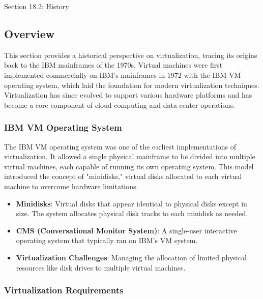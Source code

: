 \begin{notes}{Section 18.2: History}
    \subsection*{Overview}

    This section provides a historical perspective on virtualization, tracing its origins back to the IBM mainframes of the 1970s. Virtual machines were first implemented commercially on IBM's mainframes in 1972 with the IBM VM operating system, which laid the foundation for modern virtualization techniques. Virtualization has since evolved to support various hardware platforms and has become a core component of cloud computing and data-center operations.
    
    \subsubsection*{IBM VM Operating System}
    
    The IBM VM operating system was one of the earliest implementations of virtualization. It allowed a single physical mainframe to be divided into multiple virtual machines, each capable of running its own operating system. This model introduced the concept of "minidisks," virtual disks allocated to each virtual machine to overcome hardware limitations.
    
    \begin{highlight}
    
        \begin{itemize}
            \item \textbf{Minidisks}: Virtual disks that appear identical to physical disks except in size. The system allocates physical disk tracks to each minidisk as needed.
            \item \textbf{CMS (Conversational Monitor System)}: A single-user interactive operating system that typically ran on IBM's VM system.
            \item \textbf{Virtualization Challenges}: Managing the allocation of limited physical resources like disk drives to multiple virtual machines.
        \end{itemize}
    
    \end{highlight}
    
    \subsubsection*{Virtualization Requirements}
    

\end{notes}
